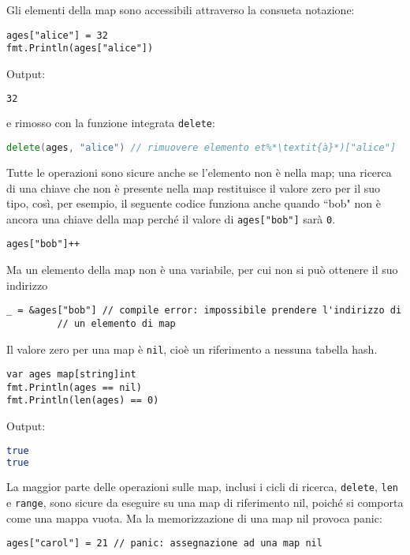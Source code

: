 \documentclass[../../thesis.tex]{subfiles}
\begin{document}
    Gli elementi della map sono accessibili attraverso la consueta notazione:
    \begin{lstlisting}[frame = single,label={lst:lstlisting3-3.4}]
ages["alice"] = 32
fmt.Println(ages["alice"])
    \end{lstlisting}
    Output:
    \begin{lstlisting}[language = bash, frame = L,label={lst:lstlisting3-3.5}]
32
    \end{lstlisting}
    e rimosso con la funzione integrata \verb"delete":
    \begin{lstlisting}[language = go, frame = single,label={lst:lstlisting3-3.6}]
delete(ages, "alice") // rimuovere elemento et%*\textit{à}*)["alice"]
    \end{lstlisting}
    Tutte le operazioni sono sicure anche se l'elemento non è nella map;
    una ricerca di una chiave che non è presente nella map restituisce il valore zero per il suo tipo, così, per esempio, il seguente codice funziona anche quando ``bob" non è ancora una chiave della map perché il valore di \verb!ages["bob"]! sarà \verb"0".
    \begin{lstlisting}[frame = single,label={lst:lstlisting3-3.7}]
ages["bob"]++
    \end{lstlisting}
    Ma un elemento della map non è una variabile, per cui non si può ottenere il suo indirizzo
    \begin{lstlisting}[frame = single,label={lst:lstlisting3-3.8}]
_ = &ages["bob"] // compile error: impossibile prendere l'indirizzo di
		 // un elemento di map
    \end{lstlisting}
    Il valore zero per una map è \verb"nil", cioè un riferimento a nessuna tabella hash.
    \begin{lstlisting}[frame = single,label={lst:lstlisting3-3.9}]
var ages map[string]int
fmt.Println(ages == nil)
fmt.Println(len(ages) == 0)
    \end{lstlisting}
    Output:
    \begin{lstlisting}[language = bash, frame = L,label={lst:lstlisting3-3.10}]
true
true
    \end{lstlisting}
    La maggior parte delle operazioni sulle map, inclusi i cicli di ricerca, \verb"delete", \verb"len" e \verb"range", sono sicure da eseguire su una map di riferimento nil, poiché si comporta come una mappa vuota.
    Ma la memorizzazione di una map nil provoca panic:
    \begin{lstlisting}[frame = single,label={lst:lstlisting3-3.11}]
ages["carol"] = 21 // panic: assegnazione ad una map nil
    \end{lstlisting}
\end{document}
